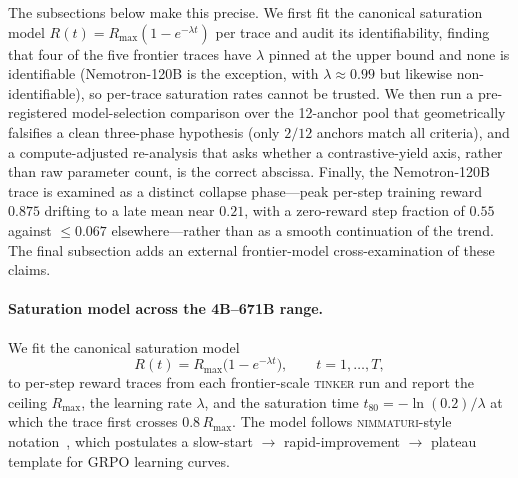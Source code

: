 \documentclass{article}
\begin{document}
The subsections below make this precise. We first fit the canonical saturation
model $R(t) = R_{\max}(1 - e^{-\lambda t})$ per trace and audit its
identifiability, finding that four of the five frontier traces have $\lambda$
pinned at the upper bound and none is identifiable (Nemotron-120B is the exception,
with $\lambda\!\approx\!0.99$ but likewise non-identifiable), so per-trace saturation
rates cannot be trusted. We then run a pre-registered model-selection comparison over the
12-anchor pool that geometrically falsifies a clean three-phase hypothesis (only
$2/12$ anchors match all criteria), and a compute-adjusted re-analysis that asks
whether a contrastive-yield axis, rather than raw parameter count, is the correct
abscissa. Finally, the Nemotron-120B trace is examined as a distinct collapse
phase---peak per-step training reward $0.875$ drifting to a late mean near $0.21$, with a
zero-reward step fraction of $0.55$ against $\le 0.067$ elsewhere---rather than as a
smooth continuation of the trend. The final subsection adds an external
frontier-model cross-examination of these claims.
 

\paragraph{Saturation model across the 4B--671B range.}
\label{par:saturation}
We fit the canonical saturation model
\begin{equation}
  \label{eq:sat}
  R(t) = R_{\max}\bigl(1 - e^{-\lambda t}\bigr),
  \qquad t = 1, \dots, T,
\end{equation}
to per-step reward traces from each frontier-scale
\textsc{tinker} run and report the ceiling $R_{\max}$, the
learning rate $\lambda$, and the saturation time
$t_{80} = -\ln(0.2)/\lambda$ at which the trace first crosses
$0.8\,R_{\max}$.  The model follows
\textsc{nimmaturi}-style notation~\citep{nimmaturi2025predictive},
which postulates a slow-start $\to$ rapid-improvement $\to$
plateau template for GRPO learning curves.
\end{document}
